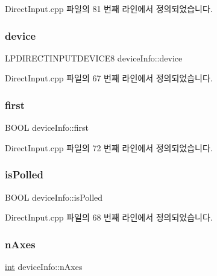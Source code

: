 Direct\+Input.\+cpp 파일의 81 번째 라인에서 정의되었습니다.

\mbox{\label{structdevice_info_a4e2b017b67b850eb267097f95776273f}} 
\subsubsection{\texorpdfstring{device}{device}}
{\footnotesize\ttfamily L\+P\+D\+I\+R\+E\+C\+T\+I\+N\+P\+U\+T\+D\+E\+V\+I\+C\+E8 device\+Info\+::device}



Direct\+Input.\+cpp 파일의 67 번째 라인에서 정의되었습니다.

\mbox{\label{structdevice_info_a0bc40134953f30c68ccf0d2d69e67f17}} 
\subsubsection{\texorpdfstring{first}{first}}
{\footnotesize\ttfamily B\+O\+OL device\+Info\+::first}



Direct\+Input.\+cpp 파일의 72 번째 라인에서 정의되었습니다.

\mbox{\label{structdevice_info_a405fccb036e90884fb822c59433c2490}} 
\subsubsection{\texorpdfstring{is\+Polled}{isPolled}}
{\footnotesize\ttfamily B\+O\+OL device\+Info\+::is\+Polled}



Direct\+Input.\+cpp 파일의 68 번째 라인에서 정의되었습니다.

\mbox{\label{structdevice_info_a5ceef6ccdfa5c12661b77e036ba91682}} 
\subsubsection{\texorpdfstring{n\+Axes}{nAxes}}
{\footnotesize\ttfamily \mbox{\hyperlink{_util_8cpp_a0ef32aa8672df19503a49fab2d0c8071}{int}} device\+Info\+::n\+Axes}



